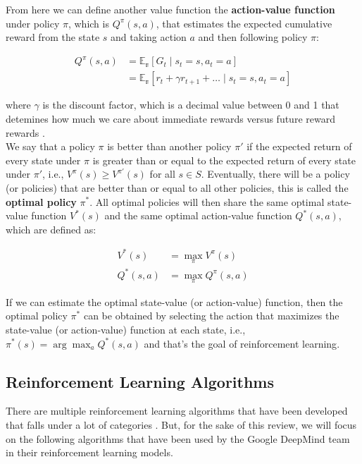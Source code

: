From here we can define another value function the \textbf{action-value function} under
policy $\pi$, which is $Q^\pi(s, a)$, that estimates the expected cumulative
reward from the state $s$ and taking action $a$ and then following policy
$\pi$:

\begin{equation}\label{eq:q_pi}
    \begin{split}
        Q^\pi(s, a) & = \mathbb{E_\pi}[G_t \mid s_t = s, a_t = a]                            \\
                    & = \mathbb{E_\pi}[r_t + \gamma r_{t+1}  + \ldots \mid s_t = s, a_t = a]
    \end{split}
\end{equation}

where $\gamma$ is the discount factor, which is a decimal value between 0 and 1
that detemines how much we care about immediate rewards versus future reward
rewards \cite{bg2}.\\

We say that a policy $\pi$ is better than another policy $\pi'$ if the expected
return of every state under $\pi$ is greater than or equal to the expected
return of every state under $\pi'$, i.e., $V^\pi(s) \geq V^{\pi'}(s)$ for all
$s \in S$. Eventually, there will be a policy (or policies) that are better
than or equal to all other policies, this is called the \textbf{optimal policy}
$\pi^*$. All optimal policies will then share the same optimal state-value
function $V^*(s)$ and the same optimal action-value function $Q^*(s, a)$, which
are defined as:

\begin{equation}
    \begin{split}
        V^*(s)    & = \max_\pi V^\pi(s)    \\
        Q^*(s, a) & = \max_\pi Q^\pi(s, a)
    \end{split}
\end{equation}

If we can estimate the optimal state-value (or action-value) function, then the
optimal policy $\pi^*$ can be obtained by selecting the action that maximizes
the state-value (or action-value) function at each state, i.e., $\pi^*(s) =
    \arg\max_a Q^*(s, a)$ and that's the goal of reinforcement learning\cite{bg2}.

\subsection{Reinforcement Learning Algorithms}
There are multiple reinforcement learning algorithms that have been developed
that falls under a lot of categories \cite{bg3}. But, for the sake of this review, we will
focus on the following algorithms that have been used by the Google DeepMind
team in their reinforcement learning models.\\

